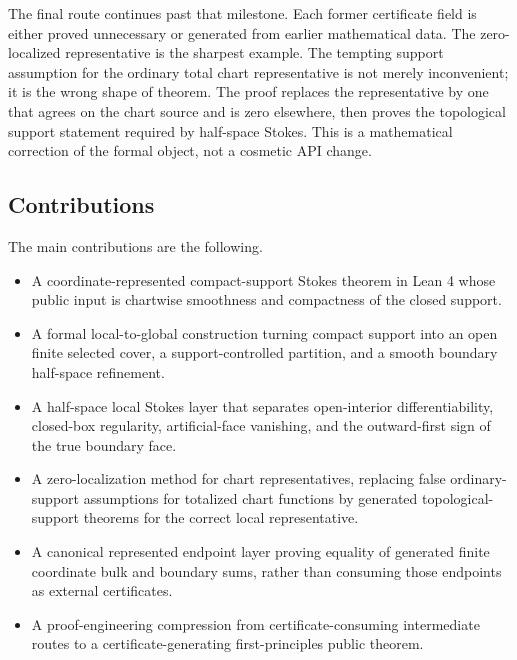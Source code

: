The final route continues past that milestone.  Each former certificate field
is either proved unnecessary or generated from earlier mathematical data.  The
zero-localized representative is the sharpest example.  The tempting support
assumption for the ordinary total chart representative is not merely
inconvenient; it is the wrong shape of theorem.  The proof replaces the
representative by one that agrees on the chart source and is zero elsewhere,
then proves the topological support statement required by half-space Stokes.
This is a mathematical correction of the formal object, not a cosmetic API
change.

\subsection{Contributions}

The main contributions are the following.

\begin{itemize}
  \item A coordinate-represented compact-support Stokes theorem in Lean 4 whose
  public input is chartwise smoothness and compactness of the closed support.

  \item A formal local-to-global construction turning compact support into an
  open finite selected cover, a support-controlled partition, and a smooth
  boundary half-space refinement.

  \item A half-space local Stokes layer that separates open-interior
  differentiability, closed-box regularity, artificial-face vanishing, and the
  outward-first sign of the true boundary face.

  \item A zero-localization method for chart representatives, replacing false
  ordinary-support assumptions for totalized chart functions by generated
  topological-support theorems for the correct local representative.

  \item A canonical represented endpoint layer proving equality of generated
  finite coordinate bulk and boundary sums, rather than consuming those
  endpoints as external certificates.

  \item A proof-engineering compression from certificate-consuming
  intermediate routes to a certificate-generating first-principles public
  theorem.
\end{itemize}

